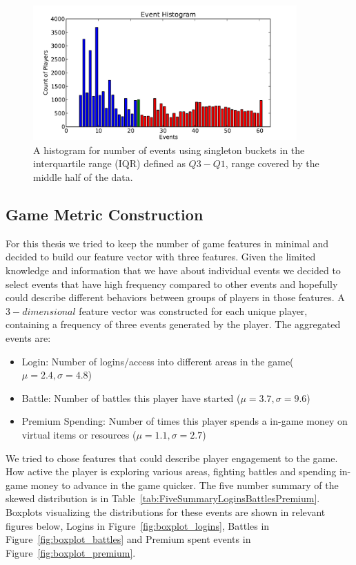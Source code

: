 \begin{figure}[here]
\centerline{\includegraphics[width=0.9\textwidth]{Figures/histogram_events_iqr.pdf}}
\caption{A histogram for number of events using singleton buckets in the interquartile range (IQR) defined as $Q3 - Q1$, range covered by the middle half of the data.}
\label{fig:histogram_events_iqr}
\end{figure}


\subsection{Game Metric Construction}
\label{gamemetric}
For this thesis we tried to keep the number of game features in minimal and decided to build our feature vector with three features. Given the limited knowledge and information that we have about individual events we decided to select events that have high frequency compared to other events and hopefully could describe different behaviors between groups of players in those features. A $3-dimensional$ feature vector was constructed for each unique player, containing a frequency of three events generated by the player. The aggregated events are:
\begin{itemize}
\item Login: Number of logins/access into different areas in the game($\mu = 2.4, \sigma = 4.8$)
\item Battle: Number of battles this player have started ($\mu = 3.7, \sigma = 9.6$)
\item Premium Spending: Number of times this player spends a in-game money on virtual items or resources ($\mu = 1.1, \sigma = 2.7$) 
\end{itemize}

We tried to chose features that could describe player engagement to the game. How active the player is exploring various areas, fighting battles and spending in-game money to advance in the game quicker. The five number summary of the skewed distribution is in Table~\ref{tab:FiveSummaryLoginsBattlesPremium}. Boxplots visualizing the distributions for these events are shown in relevant figures below, Logins in Figure~\ref{fig:boxplot_logins}, Battles in Figure~\ref{fig:boxplot_battles} and Premium spent events in Figure~\ref{fig:boxplot_premium}.


